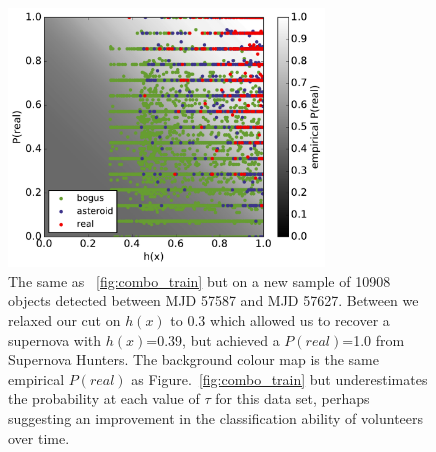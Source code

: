 \documentclass[a4paper,fleqn,usenatbib]{mnras}
\begin{document}
\begin{figure}
   \includegraphics[width=84mm]{figs/human_v_machine_20160725-20160829.pdf}
   \caption{The same as ~\ref{fig:combo_train} but on a new sample of 10908 objects detected between
            MJD 57587 and MJD 57627.  Between we relaxed our cut on $h(x)$ to 0.3 which allowed us to recover a supernova with $h(x)$=0.39, but achieved a $P(real)$=1.0 from Supernova Hunters.  The background colour map is the same empirical $P(real)$ as Figure.~\ref{fig:combo_train} but underestimates the probability at each value of $\tau$ for this data set, perhaps suggesting an improvement in the classification ability of volunteers over time.}
   \label{fig:combo_test} 
\end{figure}
\end{document}
